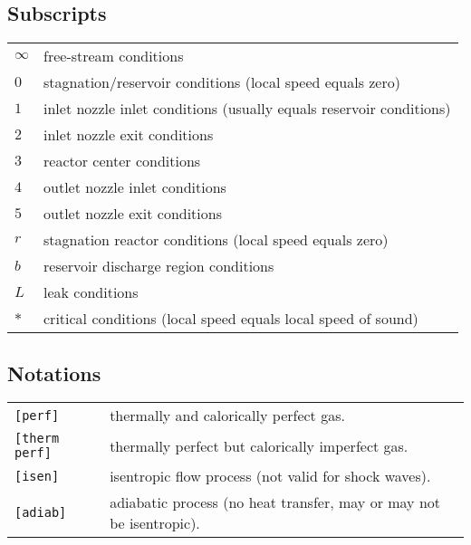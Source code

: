 \subsection*{Subscripts}

\begin{flushleft}
\renewcommand{\arraystretch}{1.2}
\begin{tabular}{ll}
$\infty$ & free-stream conditions \\
$0$ & stagnation/reservoir conditions (local speed equals zero) \\
$1$ & inlet nozzle inlet conditions (usually equals reservoir conditions) \\
$2$ & inlet nozzle exit conditions \\
$3$ & reactor center conditions \\
$4$ & outlet nozzle inlet conditions \\
$5$ & outlet nozzle exit conditions \\
$r$ & stagnation reactor conditions (local speed equals zero) \\
$b$ & reservoir discharge region conditions \\
$L$ & leak conditions \\
$*$ & critical conditions (local speed equals local speed of sound) \\
\end{tabular}
\end{flushleft}

\subsection*{Notations}

\begin{flushleft}
\renewcommand{\arraystretch}{1.3}
\begin{tabular}{ll}
    \texttt{[perf]} & thermally and calorically perfect gas. \\
    \texttt{[therm perf]} & thermally perfect but calorically imperfect gas.\\
    \texttt{[isen]} & isentropic flow process (not valid for shock waves).\\
    \texttt{[adiab]} & adiabatic process (no heat transfer, may or may not be isentropic).\\
\end{tabular}
\end{flushleft}
